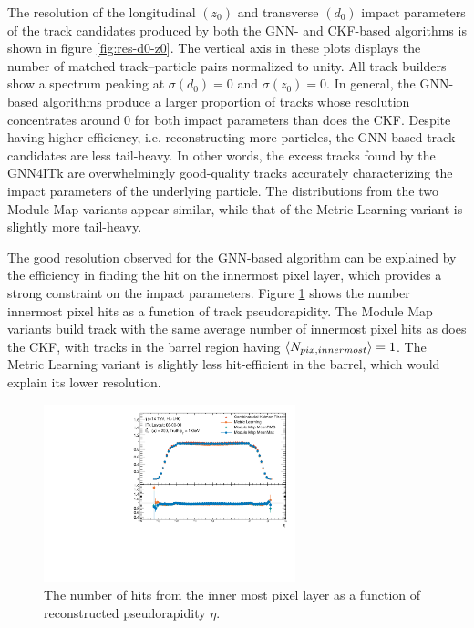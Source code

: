 The resolution of the longitudinal $(z_0)$ and transverse $(d_0)$ impact parameters of the track candidates produced by both the GNN- and CKF-based algorithms is shown in figure \ref{fig:res-d0-z0}. 
The vertical axis in these plots displays the number of matched track--particle pairs normalized to unity. 
All track builders show a spectrum peaking at $\sigma(d_0) = 0$ and $\sigma(z_0)=0$. 
In general, the GNN-based algorithms produce a larger proportion of tracks whose resolution concentrates around 0 for both impact parameters than does the CKF.
Despite having higher efficiency, i.e. reconstructing more particles, the GNN-based track candidates are less tail-heavy.
In other words, the excess tracks found by the GNN4ITk are overwhelmingly good-quality tracks accurately characterizing the impact parameters of the underlying particle.
The distributions from the two Module Map variants appear similar, while that of the Metric Learning variant is slightly more tail-heavy. 

The good resolution observed for the GNN-based algorithm can be explained by the efficiency in finding the hit on the innermost pixel layer, which provides a strong constraint on the impact parameters. 
Figure \ref{fig:n-innermost-pix} shows the number innermost pixel hits as a function of track pseudorapidity.
The Module Map variants build track with the same average number of innermost pixel hits as does the CKF, with tracks in the barrel region having $\expval{N_{pix,innermost}}=1$.
The Metric Learning variant is slightly less hit-efficient in the barrel, which would explain its lower resolution.

\begin{figure}[h!]
    \centering
    \includegraphics[width=0.65\textwidth]{figures/ckf-gnn/HitsOnTracks/nInnerMostPixelHits_vs_eta.pdf}
    \caption{The number of hits from the inner most pixel layer as a function of reconstructed pseudorapidity $\eta$.}
    \label{fig:n-innermost-pix}
\end{figure}

